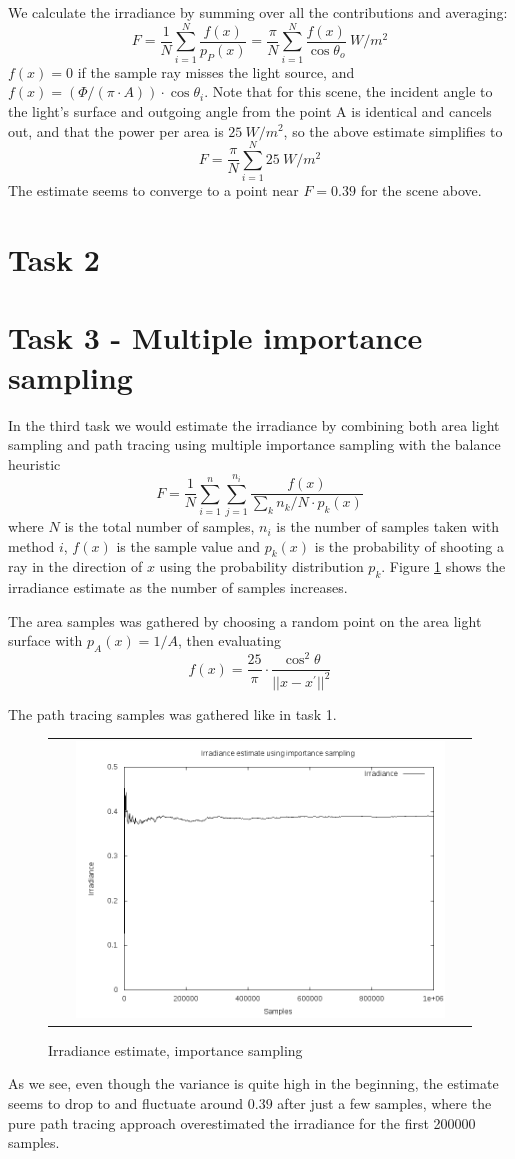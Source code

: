 \documentclass{article} %
\begin{document}
We calculate the irradiance by summing over all the contributions and averaging:
$$F=\frac{1}{N}\sum_{i=1}^N \frac{f(x)}{p_P(x)} = \frac{\pi}{N}\sum_{i=1}^N \frac{f(x)}{\cos \theta_o}\ W/m^2$$
$f(x) = 0$ if the sample ray misses the light source, and $f(x) = (\Phi/(\pi\cdot A))\cdot \cos \theta_i$. Note that for this scene, the incident angle to the light's surface and outgoing angle from the point A is identical and cancels out, and that the power per area is $25\ W/m^2$, so the above estimate simplifies to 
$$F=\frac{\pi}{N}\sum_{i=1}^N 25\ W/m^2$$
The estimate seems to converge to a point near $F=0.39$ for the scene above. 

\section{Task 2}

\section{Task 3 - Multiple importance sampling}
In the third task we would estimate the irradiance by combining both area light sampling and path tracing using multiple importance sampling with the balance heuristic
$$
F = \frac{1}{N}\sum_{i=1}^n \sum_{j=1}^{n_i} \frac{f(x)}{\sum_k n_k/N \cdot p_k(x)}
$$
where $N$ is the total number of samples, $n_i$ is the number of samples taken with method $i$, $f(x)$ is the sample value and $p_k(x)$ is the probability of shooting a ray in the direction of $x$ using the probability distribution $p_k$. Figure \ref{fig:importance} shows the irradiance estimate as the number of samples increases. 

The area samples was gathered by choosing a random point on the area light surface with $p_A(x)=1/A$, then evaluating
$$
f(x) = \frac{25}{\pi} \cdot \frac{\cos^2 \theta}{||x-x^\prime||^2}
$$

The path tracing samples was gathered like in task 1.

\begin{figure}[h]
\begin{tabular}{c}
\includegraphics[width=0.9\textwidth]{plots/irrad_importance.png}\\
\end{tabular}
\caption{Irradiance estimate, importance sampling}
\label{fig:importance}
\end{figure}

As we see, even though the variance is quite high in the beginning, the estimate seems to drop to and fluctuate around $0.39$ after just a few samples, where the pure path tracing approach overestimated the irradiance for the first 200000 samples.
\end{document}

